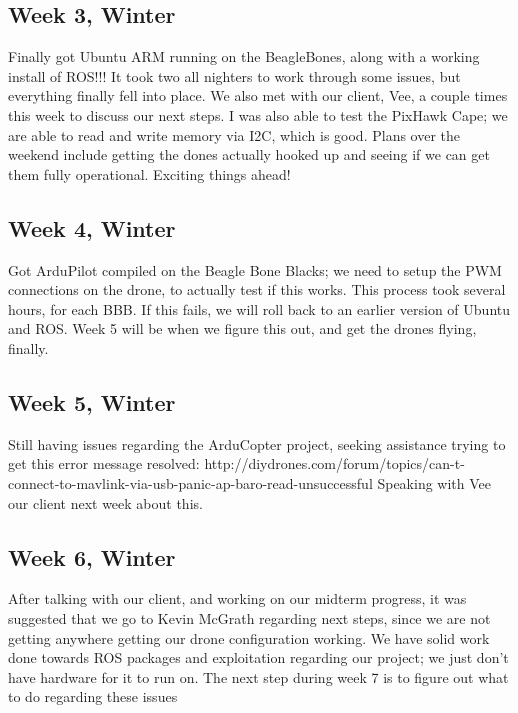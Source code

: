 \subsection{Week 3, Winter}
Finally got Ubuntu ARM running on the BeagleBones, along with a working install of ROS!!! It took two all nighters to work through some issues, but everything finally fell into place. We also met with our client, Vee, a couple times this week to discuss our next steps. I was also able to test the PixHawk Cape; we are able to read and write memory via I2C, which is good. Plans over the weekend include getting the dones actually hooked up and seeing if we can get them fully operational. Exciting things ahead!
\subsection{Week 4, Winter}
Got ArduPilot compiled on the Beagle Bone Blacks; we need to setup the PWM connections on the drone, to actually test if this works. This process took several hours, for each BBB. If this fails, we will roll back to an earlier version of Ubuntu and ROS. Week 5 will be when we figure this out, and get the drones flying, finally.
\subsection{Week 5, Winter}
Still having issues regarding the ArduCopter project, seeking assistance trying to get this error message resolved: http://diydrones.com/forum/topics/can-t-connect-to-mavlink-via-usb-panic-ap-baro-read-unsuccessful Speaking with Vee our client next week about this.
\subsection{Week 6, Winter}
After talking with our client, and working on our midterm progress, it was suggested that we go to Kevin McGrath regarding next steps, since we are not getting anywhere getting our drone configuration working. We have solid work done towards ROS packages and exploitation regarding our project; we just don't have hardware for it to run on. The next step during week 7 is to figure out what to do regarding these issues
